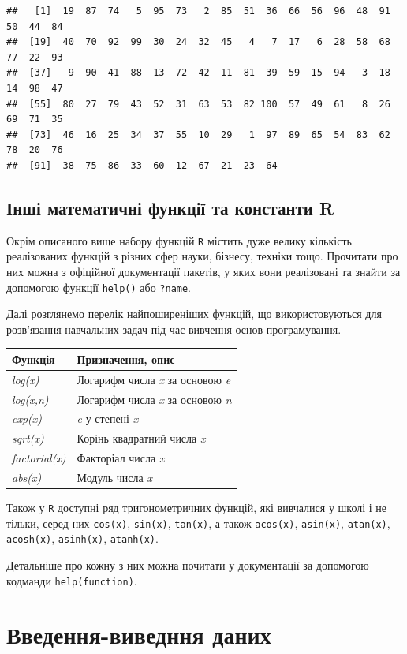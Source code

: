 \documentclass[
]{book}
\begin{document}
\begin{verbatim}
##   [1]  19  87  74   5  95  73   2  85  51  36  66  56  96  48  91  50  44  84
##  [19]  40  70  92  99  30  24  32  45   4   7  17   6  28  58  68  77  22  93
##  [37]   9  90  41  88  13  72  42  11  81  39  59  15  94   3  18  14  98  47
##  [55]  80  27  79  43  52  31  63  53  82 100  57  49  61   8  26  69  71  35
##  [73]  46  16  25  34  37  55  10  29   1  97  89  65  54  83  62  78  20  76
##  [91]  38  75  86  33  60  12  67  21  23  64
\end{verbatim}

\hypertarget{chapter244}{%
\subsection{Інші математичні функції та константи R}\label{chapter244}}

Окрім описаного вище набору функцій \texttt{R} містить дуже велику кількість реалізованих функцій з різних сфер науки, бізнесу, техніки тощо. Прочитати про них можна з офіційної документації пакетів, у яких вони реалізовані та знайти за допомогою функції \texttt{help()} або \texttt{?name}.

Далі розглянемо перелік найпоширеніших функцій, що використовуються для розв'язання навчальних задач під час вивчення основ програмування.

\begin{longtable}[]{@{}ll@{}}
\toprule
Функція & Призначення, опис\tabularnewline
\midrule
\endhead
\emph{log(x)} & Логарифм числа \emph{x} за основою \emph{e}\tabularnewline
\emph{log(x,n)} & Логарифм числа \emph{x} за основою \emph{n}\tabularnewline
\emph{exp(x)} & \emph{e} у степені \emph{x}\tabularnewline
\emph{sqrt(x)} & Корінь квадратний числа \emph{x}\tabularnewline
\emph{factorial(x)} & Факторіал числа \emph{x}\tabularnewline
\emph{abs(x)} & Модуль числа \emph{x}\tabularnewline
\bottomrule
\end{longtable}

Також у \texttt{R} доступні ряд тригонометричних функцій, які вивчалися у школі і не тільки, серед них \texttt{cos(x)}, \texttt{sin(x)}, \texttt{tan(x)}, а також \texttt{acos(x)}, \texttt{asin(x)}, \texttt{atan(x)}, \texttt{acosh(x)}, \texttt{asinh(x)}, \texttt{atanh(x)}.

Детальніше про кожну з них можна почитати у документації за допомогою кодманди \texttt{help(function)}.

\hypertarget{chapter245}{%
\section{Введення-виведння даних}\label{chapter245}}
\end{document}
